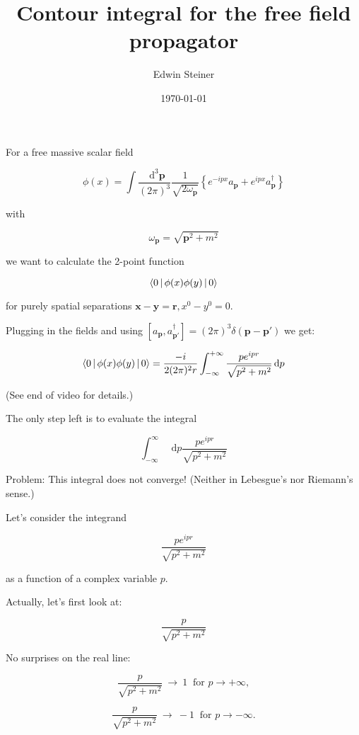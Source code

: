 \documentclass{beamer}
\title{Contour integral for the free field propagator}
\author{Edwin Steiner}
\date{\today}
\newcommand{\sqrtpm}{\sqrt{p^2 + m^2}}
\newcommand{\envelope}{\frac{p}{\sqrtpm}}
\newcommand{\integrand}{\frac{p e^{ipr}}{\sqrt{p^2 + m^2}}}
\newcommand{\vp}{\mathbf{p}}
\newcommand{\vx}{\mathbf{x}}
\newcommand{\vy}{\mathbf{y}}
\newcommand{\vr}{\mathbf{r}}
\newcommand{\vpp}{\mathbf{p}'}
\newcommand{\omvp}{\omega_{\vp}}
\newcommand{\ap}{a_{\vp}}
\newcommand{\adp}{a^\dagger_{\vp}}
\newcommand{\adpp}{a^\dagger_{\vpp}}
\newcommand{\diffop}{\mathop{}\!\mathrm{d}}
\newcommand{\dip}{\diffop p}
\newcommand{\intpthree}{\int \frac{\diffop^3\vp}{(2\pi)^3}}
\newcommand{\com}[2]{[{#1},{#2}]}
\newcommand{\phixy}{\Braket{0|\phi(x)\phi(y)|0}}
\newcommand{\intii}{\int_{-\infty}^{+\infty}}
\begin{document}

\begin{frame}
\titlepage
\end{frame}


\begin{frame}
For a free massive \alert{scalar field}

\pause
$$\phi(x) = \intpthree \frac{1}{\sqrt{2\omvp}} \left\{ e^{-ipx} \ap + e^{ipx} \adp \right\}$$

with

$$\omvp = \sqrt{\vp^2 + m^2}$$

\pause
we want to calculate the \alert{2-point function}

\pause
$$\phixy$$

\pause
for \alert{purely spatial} separations $\vx - \vy = \vr, x^0 - y^0 = 0$.

\end{frame}


\begin{frame}
Plugging in the fields and using $\com{\ap}{\adpp} = (2\pi)^3 \delta(\vp - \vpp)$ we get:

\pause
$$\phixy = \frac{-i}{2(2\pi)^2 r} \intii \frac{p e^{ipr}}{\sqrtpm} \dip$$

\pause
\medskip
(See end of video for details.)

\end{frame}



\begin{frame}
The only step left is to evaluate the integral

$$\int_{-\infty}^{\infty} \dip \integrand$$

\pause
Problem: \alert{This integral does not converge!} (Neither in Lebesgue's
nor Riemann's sense.)
\end{frame}


\begin{frame}
Let's consider the integrand

$$\integrand$$

as a function of a \alert{complex} variable $p$.

\end{frame}


\begin{frame}
Actually, let's first look at:

$$\envelope$$

\pause
No surprises on the real line:

\pause
$$\envelope \ \rightarrow \ 1 \ \textrm{ for } p \rightarrow +\infty,$$

$$\envelope \ \rightarrow \ -1 \ \textrm{ for } p \rightarrow -\infty.$$

\end{frame}
\end{document}
